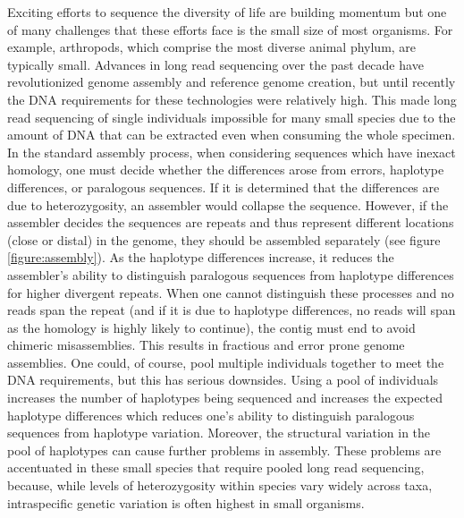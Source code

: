 \par{
Exciting efforts to sequence the diversity of life are building momentum\cite{Lewin2018-lc} but one of many challenges that these efforts face is the small size of most organisms. For example, arthropods, which comprise the most diverse animal phylum, are typically small. Advances in long read sequencing over the past decade have revolutionized genome assembly and reference genome creation\cite{pacbio}\cite{oxford}, but until recently the DNA requirements for these technologies were relatively high. This made long read sequencing of single individuals impossible for many small species due to the amount of DNA that can be extracted even when consuming the whole specimen. In the standard assembly process, when considering sequences which have inexact homology, one must decide whether the differences arose from errors, haplotype differences, or paralogous sequences. If it is determined that the differences are due to heterozygosity, an assembler would collapse the sequence. However, if the assembler decides the sequences are repeats and thus represent different locations (close or distal) in the genome, they should be assembled separately (see figure \ref{figure:assembly}). As the haplotype differences increase, it reduces the assembler's ability to distinguish paralogous sequences from haplotype differences for higher divergent repeats. When one cannot distinguish these processes and no reads span the repeat (and if it is due to haplotype differences, no reads will span as the homology is highly likely to continue), the contig must end to avoid chimeric misassemblies. This results in fractious and error prone genome assemblies. One could, of course, pool multiple individuals together to meet the DNA requirements, but this has serious downsides. Using a pool of individuals increases the number of haplotypes being sequenced and increases the expected haplotype differences which reduces one's ability to distinguish paralogous sequences from haplotype variation. Moreover, the structural variation in the pool of haplotypes can cause further problems in assembly. These problems are accentuated in these small species that require pooled long read sequencing, because, while levels of heterozygosity within species vary widely across taxa, intraspecific genetic variation is often highest in small organisms\cite{Leffler2012-uh}. 
}

